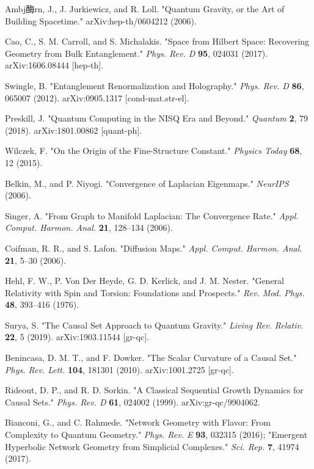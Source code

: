 \documentclass[11pt,a4paper]{article}
\theoremstyle{plain}
\theoremstyle{definition}
\begin{document}
\cite{Ambjorn2006} Ambj酶rn, J., J. Jurkiewicz, and R. Loll. "Quantum Gravity, or the Art of Building Spacetime." arXiv:hep-th/0604212 (2006).

\cite{Cao2017} Cao, C., S. M. Carroll, and S. Michalakis. "Space from Hilbert Space: Recovering Geometry from Bulk Entanglement." \textit{Phys. Rev. D} \textbf{95}, 024031 (2017). arXiv:1606.08444 [hep-th].

\cite{Swingle2012} Swingle, B. "Entanglement Renormalization and Holography." \textit{Phys. Rev. D} \textbf{86}, 065007 (2012). arXiv:0905.1317 [cond-mat.str-el].

\cite{Preskill2018} Preskill, J. "Quantum Computing in the NISQ Era and Beyond." \textit{Quantum} \textbf{2}, 79 (2018). arXiv:1801.00862 [quant-ph].

\cite{Wilczek2015} Wilczek, F. "On the Origin of the Fine-Structure Constant." \textit{Physics Today} \textbf{68}, 12 (2015).

\cite{Belkin2006} Belkin, M., and P. Niyogi. "Convergence of Laplacian Eigenmaps." \textit{NeurIPS} (2006).

\cite{Singer2006} Singer, A. "From Graph to Manifold Laplacian: The Convergence Rate." \textit{Appl. Comput. Harmon. Anal.} \textbf{21}, 128–134 (2006).

\cite{Coifman2006} Coifman, R. R., and S. Lafon. "Diffusion Maps." \textit{Appl. Comput. Harmon. Anal.} \textbf{21}, 5–30 (2006).

\cite{Hehl1976} Hehl, F. W., P. Von Der Heyde, G. D. Kerlick, and J. M. Nester. "General Relativity with Spin and Torsion: Foundations and Prospects." \textit{Rev. Mod. Phys.} \textbf{48}, 393–416 (1976).

\cite{Surya2019} Surya, S. "The Causal Set Approach to Quantum Gravity." \textit{Living Rev. Relativ.} \textbf{22}, 5 (2019). arXiv:1903.11544 [gr-qc].

\cite{Benincasa2010} Benincasa, D. M. T., and F. Dowker. "The Scalar Curvature of a Causal Set." \textit{Phys. Rev. Lett.} \textbf{104}, 181301 (2010). arXiv:1001.2725 [gr-qc].

\cite{Rideout1999} Rideout, D. P., and R. D. Sorkin. "A Classical Sequential Growth Dynamics for Causal Sets." \textit{Phys. Rev. D} \textbf{61}, 024002 (1999). arXiv:gr-qc/9904062.

\cite{Bianconi2016} Bianconi, G., and C. Rahmede. "Network Geometry with Flavor: From Complexity to Quantum Geometry." \textit{Phys. Rev. E} \textbf{93}, 032315 (2016); "Emergent Hyperbolic Network Geometry from Simplicial Complexes." \textit{Sci. Rep.} \textbf{7}, 41974 (2017).
\end{document}

